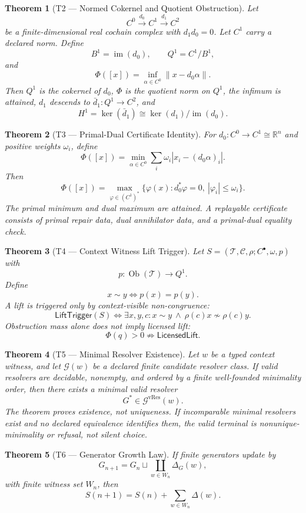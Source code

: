 \documentclass[11pt]{article}
\newtheorem{theorem}{Theorem}[section]
\theoremstyle{definition}
\begin{document}
\begin{theorem}[T2 — Normed Cokernel and Quotient Obstruction]
Let
\[
C^0\xrightarrow{d_0}C^1\xrightarrow{d_1}C^2
\]
be a finite-dimensional real cochain complex with \(d_1d_0=0\). Let \(C^1\) carry a declared norm. Define
\[
B^1=\operatorname{im}(d_0),
\qquad
Q^1=C^1/B^1,
\]
and
\[
\Phi([x])=\inf_{\alpha\in C^0}\|x-d_0\alpha\|.
\]
Then \(Q^1\) is the cokernel of \(d_0\), \(\Phi\) is the quotient norm on \(Q^1\), the infimum is attained, \(d_1\) descends to \(\bar d_1:Q^1\to C^2\), and
\[
H^1=\ker(\bar d_1)\cong\ker(d_1)/\operatorname{im}(d_0).
\]
\end{theorem}

\begin{theorem}[T3 — Primal-Dual Certificate Identity]
For \(d_0:C^0\to C^1\cong\mathbb R^n\) and positive weights \(\omega_i\), define
\[
\Phi([x])=
\min_{\alpha\in C^0}\sum_i\omega_i|x_i-(d_0\alpha)_i|.
\]
Then
\[
\boxed{
\Phi([x])=
\max_{\varphi\in(C^1)^*}
\{\varphi(x): d_0^*\varphi=0,\ |\varphi_i|\le \omega_i\}.
}
\]
The primal minimum and dual maximum are attained. A replayable certificate consists of primal repair data, dual annihilator data, and a primal-dual equality check.
\end{theorem}

\begin{theorem}[T4 — Context Witness Lift Trigger]
Let \(S=(\mathcal T,\mathcal C,\rho;C^\bullet,\omega,p)\) with
\[
p:\operatorname{Ob}(\mathcal T)\to Q^1.
\]
Define
\[
x\sim y\iff p(x)=p(y).
\]
A lift is triggered only by context-visible non-congruence:
\[
\boxed{
\mathsf{LiftTrigger}(S)
\iff
\exists x,y,c:
 x\sim y\ \wedge\ \rho(c)x\not\sim\rho(c)y.
}
\]
Obstruction mass alone does not imply licensed lift:
\[
\Phi(q)>0\not\Rightarrow\mathsf{LicensedLift}.
\]
\end{theorem}

\begin{theorem}[T5 — Minimal Resolver Existence]
Let \(w\) be a typed context witness, and let \(\mathcal G(w)\) be a declared finite candidate resolver class. If valid resolvers are decidable, nonempty, and ordered by a finite well-founded minimality order, then there exists a minimal valid resolver
\[
G^*\in\mathcal G^{\mathrm{vRes}}(w).
\]
The theorem proves existence, not uniqueness. If incomparable minimal resolvers exist and no declared equivalence identifies them, the valid terminal is nonunique-minimality or refusal, not silent choice.
\end{theorem}

\begin{theorem}[T6 — Generator Growth Law]
If finite generators update by
\[
G_{n+1}=G_n\sqcup\coprod_{w\in W_n}\Delta_G(w),
\]
with finite witness set \(W_n\), then
\[
\boxed{
S(n+1)=S(n)+\sum_{w\in W_n}\Delta(w).
}
\]
\end{theorem}
\end{document}
